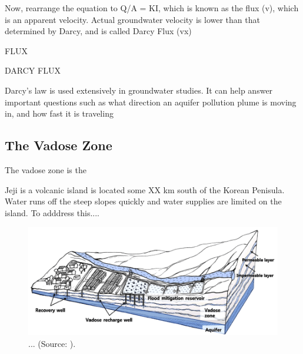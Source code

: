 \documentclass{book}\usepackage{knitr}
\begin{document}
Now, rearrange the equation to Q/A = KI, which is known as the flux (v), which is an apparent velocity. Actual groundwater velocity is lower than that determined by Darcy, and is called Darcy Flux (vx)

FLUX

DARCY FLUX

Darcy's law is used extensively in groundwater studies. It can help answer important questions such as what direction an aquifer pollution plume is moving in, and how fast it is traveling

\subsection{The Vadose Zone}

The vadose zone is the 

Jeji is a volcanic island is located some XX km south of the Korean Penisula. Water runs off the steep slopes quickly and water supplies are limited on the island. To adddress this...\citet{lee2017fifty}.

\begin{figure}
\includegraphics[width=\linewidth]{images/critical-zone/Lee-Vadose.png}
\caption{... (Source: \citep{lee2017fifty}).}
\label{fig:vadose2}
\end{figure}
\end{document}
